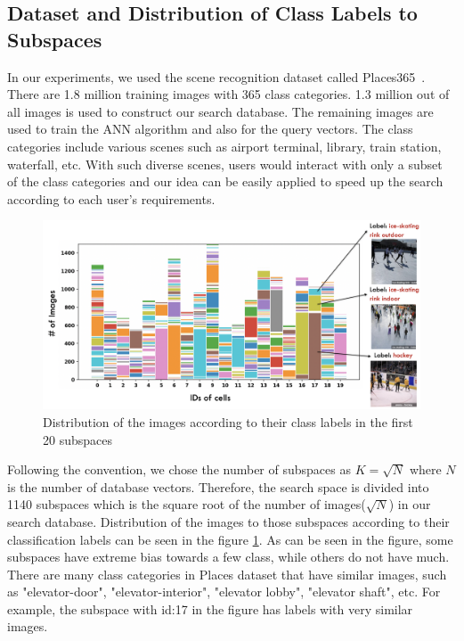 \subsection{Dataset and Distribution of Class Labels to Subspaces}
\label{retrievallabelinfo}

In our experiments, we used the scene recognition dataset called Places365~\cite{zhou2017places}. 
There are 1.8 million training images with 365 class categories. 
1.3 million out of all images is used to construct our search database. The remaining images are used to train the ANN algorithm and also for the query vectors.
The class categories include various scenes such as airport terminal, library, train station, waterfall, etc. 
With such diverse scenes, users would interact with only a subset of the class categories and our idea can be easily applied to speed up the search according to each user's requirements.

\begin{figure}
    \centering
    \includegraphics[width=\textwidth]{thesis/images/label_dist-fig.png}
    \caption{Distribution of the images according to their class labels in the first 20 subspaces}
    \label{fig:label-dist}
\end{figure}

Following the convention, we chose the number of subspaces as $K=\sqrt{N}$ where $N$ is the number of database vectors. 
Therefore, the search space is divided into 1140 subspaces which is the square root of the number of images($\sqrt{N}$) in our search database. 
Distribution of the images to those subspaces according to their classification labels can be seen in the figure \ref{fig:label-dist}.
As can be seen in the figure, some subspaces have extreme bias towards a few class, while others do not have much. 
There are many class categories in Places dataset that have similar images, such as "elevator-door", "elevator-interior", "elevator lobby", "elevator shaft", etc.
For example, the subspace with id:17 in the figure has labels with very similar images.


